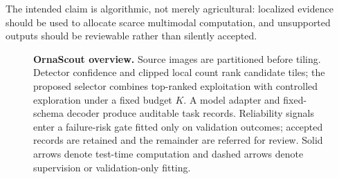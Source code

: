 The intended claim is algorithmic, not merely agricultural: localized evidence should be used to allocate scarce multimodal computation, and unsupported outputs should be reviewable rather than silently accepted.

\begin{figure}[t]
    \centering
    \resizebox{\textwidth}{!}{}
    \caption{\textbf{OrnaScout overview.} Source images are partitioned before tiling. Detector confidence and clipped local count rank candidate tiles; the proposed selector combines top-ranked exploitation with controlled exploration under a fixed budget $K$. A model adapter and fixed-schema decoder produce auditable task records. Reliability signals enter a failure-risk gate fitted only on validation outcomes; accepted records are retained and the remainder are referred for review. Solid arrows denote test-time computation and dashed arrows denote supervision or validation-only fitting.}
    \label{fig:architecture}
\end{figure}
